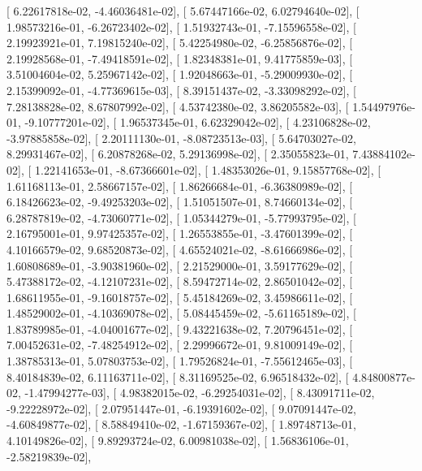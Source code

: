 \documentclass{article}
\begin{document}
       [  6.22617818e-02,  -4.46036481e-02],
       [  5.67447166e-02,   6.02794640e-02],
       [  1.98573216e-01,  -6.26723402e-02],
       [  1.51932743e-01,  -7.15596558e-02],
       [  2.19923921e-01,   7.19815240e-02],
       [  5.42254980e-02,  -6.25856876e-02],
       [  2.19928568e-01,  -7.49418591e-02],
       [  1.82348381e-01,   9.41775859e-03],
       [  3.51004604e-02,   5.25967142e-02],
       [  1.92048663e-01,  -5.29009930e-02],
       [  2.15399092e-01,  -4.77369615e-03],
       [  8.39151437e-02,  -3.33098292e-02],
       [  7.28138828e-02,   8.67807992e-02],
       [  4.53742380e-02,   3.86205582e-03],
       [  1.54497976e-01,  -9.10777201e-02],
       [  1.96537345e-01,   6.62329042e-02],
       [  4.23106828e-02,  -3.97885858e-02],
       [  2.20111130e-01,  -8.08723513e-03],
       [  5.64703027e-02,   8.29931467e-02],
       [  6.20878268e-02,   5.29136998e-02],
       [  2.35055823e-01,   7.43884102e-02],
       [  1.22141653e-01,  -8.67366601e-02],
       [  1.48353026e-01,   9.15857768e-02],
       [  1.61168113e-01,   2.58667157e-02],
       [  1.86266684e-01,  -6.36380989e-02],
       [  6.18426623e-02,  -9.49253203e-02],
       [  1.51051507e-01,   8.74660134e-02],
       [  6.28787819e-02,  -4.73060771e-02],
       [  1.05344279e-01,  -5.77993795e-02],
       [  2.16795001e-01,   9.97425357e-02],
       [  1.26553855e-01,  -3.47601399e-02],
       [  4.10166579e-02,   9.68520873e-02],
       [  4.65524021e-02,  -8.61666986e-02],
       [  1.60808689e-01,  -3.90381960e-02],
       [  2.21529000e-01,   3.59177629e-02],
       [  5.47388172e-02,  -4.12107231e-02],
       [  8.59472714e-02,   2.86501042e-02],
       [  1.68611955e-01,  -9.16018757e-02],
       [  5.45184269e-02,   3.45986611e-02],
       [  1.48529002e-01,  -4.10369078e-02],
       [  5.08445459e-02,  -5.61165189e-02],
       [  1.83789985e-01,  -4.04001677e-02],
       [  9.43221638e-02,   7.20796451e-02],
       [  7.00452631e-02,  -7.48254912e-02],
       [  2.29996672e-01,   9.81009149e-02],
       [  1.38785313e-01,   5.07803753e-02],
       [  1.79526824e-01,  -7.55612465e-03],
       [  8.40184839e-02,   6.11163711e-02],
       [  8.31169525e-02,   6.96518432e-02],
       [  4.84800877e-02,  -1.47994277e-03],
       [  4.98382015e-02,  -6.29254031e-02],
       [  8.43091711e-02,  -9.22228972e-02],
       [  2.07951447e-01,  -6.19391602e-02],
       [  9.07091447e-02,  -4.60849877e-02],
       [  8.58849410e-02,  -1.67159367e-02],
       [  1.89748713e-01,   4.10149826e-02],
       [  9.89293724e-02,   6.00981038e-02],
       [  1.56836106e-01,  -2.58219839e-02],
\end{document}
